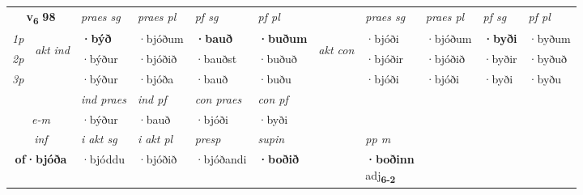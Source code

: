 \noindent
\begin{tabular}{lllllllllll} \toprule
\multicolumn{2}{c}{\textbf{v{\textsubscript{6}}} \Large{\textbf{98}}}  &  \textit{praes sg}  & \textit{praes pl}  &\textit{ pf sg} & \textit{pf pl} &  &  \textit{praes sg}  & \textit{praes pl}  & \textit{pf sg} & \textit{pf pl } \\*
	\cmidrule{3-6} \cmidrule{8-11}
 {\textit{1p}} & \multirow{3}{*}{\begin{turn}{90}\textit{akt ind}\end{turn}} & \textbf{·býð} & ·bjóðum & \textbf{·bauð} & \textbf{·buðum} & \multirow{3}{*}{\begin{turn}{90}\textit{akt con}\end{turn}} &·bjóði & ·bjóðum & \textbf{·byði} & ·byðum\\*
 {\textit{2p}} &  &  ·býður  & ·bjóðið & ·bauðst & ·buðuð & & ·bjóðir & ·bjóðið & ·byðir & ·byðuð \\*
{\textit{3p}} &  & ·býður & ·bjóða & ·bauð & ·buðu & & ·bjóði & ·bjóði& ·byði & ·byðu \\*
\cmidrule{3-6} \cmidrule{8-11}

   & &  \textit{ind praes} & \textit{ind pf} & \textit{con praes} & \textit{con pf} \\*
\multicolumn{2}{c}{ \textit{e-m} } & ·býður & ·bauð & ·bjóði & ·byði \\*

\cmidrule{3-8}
   \multicolumn{2}{c}{\textit{inf}}  & \textit{i akt sg} & \textit{i akt pl}   & \textit{presp} & \textit{supin}  && \textit{pp m} \\*
  \multicolumn{2}{c}{\textbf{of\allowbreak ·bjóða}} & ·bjóddu  & ·bjóðið   & ·bjóðandi &  \textbf{·boðið}  && \specialcell{\textbf{·boðinn} \\ adj\textbf{\textsubscript{6-2}}} \\*
\end{tabular}

